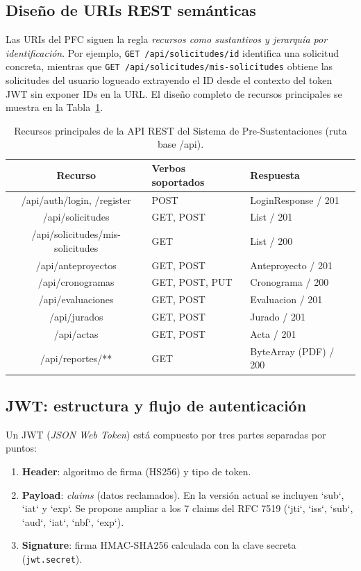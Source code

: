 \subsection{Diseño de URIs REST semánticas}

Las URIs del PFC siguen la regla \textit{recursos como sustantivos y jerarquía por identificación}. Por ejemplo,
\texttt{GET /api/solicitudes/{id}} identifica una solicitud concreta, mientras que
\texttt{GET /api/solicitudes/mis-solicitudes} obtiene las solicitudes del usuario logueado extrayendo el ID desde
el contexto del token JWT sin exponer IDs en la URL. El diseño completo de recursos principales se muestra en la
Tabla~\ref{tab:uris}.

\begin{table}[H]
\centering
\small
\begin{tabular}{@{}cll@{}}
\toprule
\textbf{Recurso} & \textbf{Verbos soportados} & \textbf{Respuesta} \\
\midrule
/api/auth/login, /register & POST & LoginResponse / 201 \\
/api/solicitudes & GET, POST & List / 201 \\
/api/solicitudes/mis-solicitudes & GET & List / 200 \\
/api/anteproyectos & GET, POST & Anteproyecto / 201 \\
/api/cronogramas & GET, POST, PUT & Cronograma / 200 \\
/api/evaluaciones & GET, POST & Evaluacion / 201 \\
/api/jurados & GET, POST & Jurado / 201 \\
/api/actas & GET, POST & Acta / 201 \\
/api/reportes/** & GET & ByteArray (PDF) / 200 \\
\bottomrule
\end{tabular}
\caption{Recursos principales de la API REST del Sistema de Pre-Sustentaciones (ruta base /api).}
\label{tab:uris}
\end{table}

\subsection{JWT: estructura y flujo de autenticación}

Un JWT (\textit{JSON Web Token}) está compuesto por tres partes separadas por puntos:
\begin{enumerate}
    \item \textbf{Header}: algoritmo de firma (HS256) y tipo de token.
    \item \textbf{Payload}: \textit{claims} (datos reclamados). En la versión actual se incluyen `sub`, `iat` y `exp`.
    Se propone ampliar a los 7 claims del RFC 7519 (`jti`, `iss`, `sub`, `aud`, `iat`, `nbf`, `exp`).
    \item \textbf{Signature}: firma HMAC-SHA256 calculada con la clave secreta (\texttt{jwt.secret}).
\end{enumerate}

